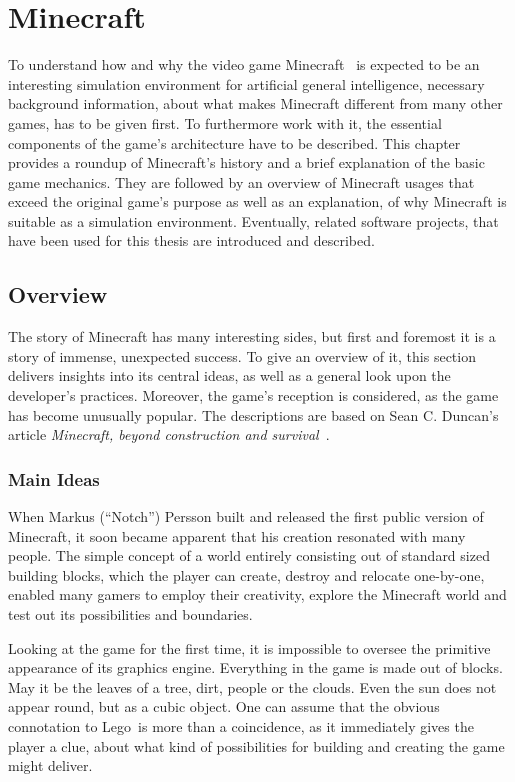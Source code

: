 \chapter{Minecraft}
\label{chap:3}
To understand how and why the video game Minecraft~\cite{minecraft} is expected to be an interesting simulation environment for artificial general intelligence, necessary background information, about what makes Minecraft different from many other games, has to be given first. To furthermore work with it, the essential components of the game's architecture have to be described. This chapter provides a roundup of Minecraft's history and a brief explanation of the basic game mechanics. They are followed by an overview of Minecraft usages that exceed the original game's purpose as well as an explanation, of why Minecraft is suitable as a simulation environment. Eventually, related software projects, that have been used for this thesis are introduced and described.

    \section{Overview}
The story of Minecraft has many interesting sides, but first and foremost it is a story of immense, unexpected success. To give an overview of it, this section delivers insights into its central ideas, as well as a general look upon the developer's practices. Moreover, the game's reception is considered, as the game has become unusually popular. The descriptions are based on Sean C. Duncan's article \emph{Minecraft, beyond construction and survival}~\cite{Duncan:2011:MBC:2207096.2207097}.
    
        \subsection{Main Ideas}
When Markus (``Notch'') Persson built and released the first public version of Minecraft, it soon became apparent that his creation resonated with many people. The simple concept of a world entirely consisting out of standard sized building blocks, which the player can create, destroy and relocate one-by-one, enabled many gamers to employ their creativity, explore the Minecraft world and test out its possibilities and boundaries.

Looking at the game for the first time, it is impossible to oversee the primitive appearance of its graphics engine. Everything in the game is made out of blocks. May it be the leaves of a tree, dirt, people or the clouds. Even the sun does not appear round, but as a cubic object. One can assume that the obvious connotation to Lego\texttrademark~is more than a coincidence, as it immediately gives the player a clue, about what kind of possibilities for building and creating the game might deliver.

